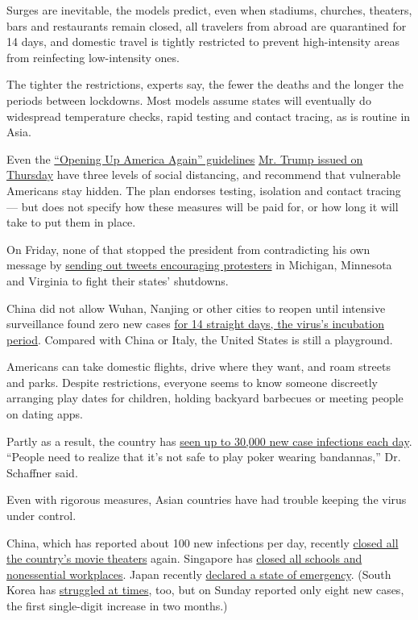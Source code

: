 Surges are inevitable, the models predict, even when stadiums, churches,
theaters, bars and restaurants remain closed, all travelers from abroad
are quarantined for 14 days, and domestic travel is tightly restricted
to prevent high-intensity areas from reinfecting low-intensity ones.

The tighter the restrictions, experts say, the fewer the deaths and the
longer the periods between lockdowns. Most models assume states will
eventually do widespread temperature checks, rapid testing and contact
tracing, as is routine in Asia.

Even the \href{https://www.whitehouse.gov/openingamerica/}{``Opening Up
America Again'' guidelines}
\href{https://www.nytimes.com/2020/04/16/us/politics/coronavirus-trump-guidelines.html}{Mr.
Trump issued on Thursday} have three levels of social distancing, and
recommend that vulnerable Americans stay hidden. The plan endorses
testing, isolation and contact tracing --- but does not specify how
these measures will be paid for, or how long it will take to put them in
place.

On Friday, none of that stopped the president from contradicting his own
message by
\href{https://www.nytimes.com/2020/04/17/us/coronavirus-cases-news-update.html\#link-23cd1c40}{sending
out tweets encouraging protesters} in Michigan, Minnesota and Virginia
to fight their states' shutdowns.

China did not allow Wuhan, Nanjing or other cities to reopen until
intensive surveillance found zero new cases
\href{https://www.cnn.com/2020/03/24/asia/coronavirus-wuhan-lockdown-lifted-intl-hnk/index.html}{for
14 straight days, the virus's incubation period}. Compared with China or
Italy, the United States is still a playground.

Americans can take domestic flights, drive where they want, and roam
streets and parks. Despite restrictions, everyone seems to know someone
discreetly arranging play dates for children, holding backyard barbecues
or meeting people on dating apps.

Partly as a result, the country has
\href{https://www.worldometers.info/coronavirus/country/us/}{seen up to
30,000 new case infections each day}. ``People need to realize that it's
not safe to play poker wearing bandannas,'' Dr. Schaffner said.

Even with rigorous measures, Asian countries have had trouble keeping
the virus under control.

China, which has reported about 100 new infections per day, recently
\href{https://www.businessinsider.com/coronavirus-china-orders-all-movie-theaters-to-close-again-2020-3}{closed
all the country's movie theaters} again. Singapore has
\href{https://www.cnbc.com/2020/04/03/singapore-shuts-schools-temporarily-closes-workplaces-to-curb-coronavirus.html}{closed
all schools and nonessential workplaces}. Japan recently
\href{https://www.nytimes.com/2020/04/07/world/asia/japan-coronavirus-emergency.html}{declared
a state of emergency}. (South Korea has
\href{https://www.nbcnews.com/news/world/south-korea-s-return-normal-interrupted-uptick-coronavirus-cases-n1176021}{struggled
at times}, too, but on Sunday reported only eight new cases, the first
single-digit increase in two months.)

